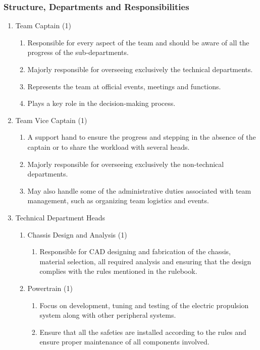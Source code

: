 \documentclass[12pt]{article}
\begin{document}
\subsubsection{Structure, Departments and Responsibilities}
\begin{enumerate}
    \item Team Captain (1)
    \begin{enumerate}
        \item Responsible for every aspect of the team and should be aware of all the progress of the sub-departments.
        \item Majorly responsible for overseeing exclusively the technical departments.
        \item Represents the team at official events, meetings and functions.
        \item Plays a key role in the decision-making process.
    \end{enumerate}
    \item Team Vice Captain (1)
    \begin{enumerate}
        \item A support hand to ensure the progress and stepping in the absence of the captain or to share the workload with several heads.
        \item Majorly responsible for overseeing exclusively the non-technical departments.
        \item May also handle some of the administrative duties associated with team management, such as organizing team logistics and events.
    \end{enumerate}
    \item Technical Department Heads
    \begin{enumerate}
        \item Chassis Design and Analysis (1)
        \begin{enumerate}
            \item Responsible for CAD designing and fabrication of the chassis, material selection, all required analysis and ensuring that the design complies with the rules mentioned in the rulebook.
        \end{enumerate}
        \item Powertrain (1)
        \begin{enumerate}
            \item Focus on development, tuning and testing of the electric propulsion system along with other peripheral systems.
            \item Ensure that all the safeties are installed according to the rules and ensure proper maintenance of all components involved.

\end{enumerate}
\end{enumerate}
\end{enumerate}
\end{document}
